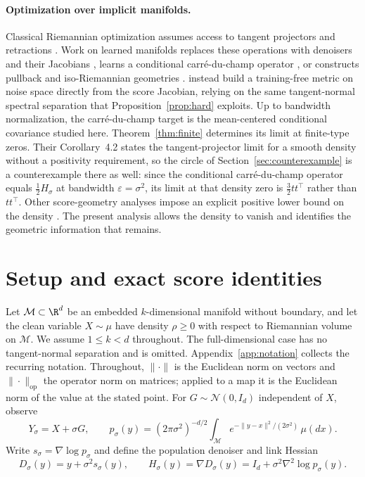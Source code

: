 \documentclass[10pt]{article}
\theoremstyle{c2fup}
\newcommand{\M}{\mathcal{M}}
\newcommand{\op}{\mathrm{op}}
\newcommand{\cN}{\mathcal{N}}
\begin{document}
\paragraph{Optimization over implicit manifolds.}
Classical Riemannian optimization assumes access to tangent projectors and retractions \citep{absil2008optimization,boumal2023introduction}.  Work on learned manifolds replaces these operations with denoisers and their Jacobians \citep{kharitenko2026landing}, learns a conditional carré-du-champ operator \citep{bamberger2026metric}, or constructs pullback and iso-Riemannian geometries \citep{diepeveen2025pullback,diepeveen2026iso}.  \citet{saito2025tangential} instead build a training-free metric on noise space directly from the score Jacobian, relying on the same tangent-normal spectral separation that Proposition~\ref{prop:hard} exploits.  Up to bandwidth normalization, the carré-du-champ target is the mean-centered conditional covariance studied here.  Theorem~\ref{thm:finite} determines its limit at finite-type zeros.  Their Corollary~4.2 states the tangent-projector limit for a smooth density without a positivity requirement, so the circle of Section~\ref{sec:counterexample} is a counterexample there as well: since the conditional carré-du-champ operator equals $\tfrac12H_\sigma$ at bandwidth $\varepsilon=\sigma^2$, its limit at that density zero is $\tfrac32tt^\top$ rather than $tt^\top$.  Other score-geometry analyses impose an explicit positive lower bound on the density \citep{stanczuk2024diffusion,li2026scores,zhang2026score}.  The present analysis allows the density to vanish and identifies the geometric information that remains.

\section{Setup and exact score identities}
\label{sec:setup}

Let $\M\subset\R^d$ be an embedded $k$-dimensional manifold without boundary, and let the clean variable $X\sim\mu$ have density $\rho\ge0$ with respect to Riemannian volume on $\M$.  We assume $1\le k<d$ throughout.  The full-dimensional case has no tangent-normal separation and is omitted.  Appendix~\ref{app:notation} collects the recurring notation.  Throughout, $\|\cdot\|$ is the Euclidean norm on vectors and $\|\cdot\|_\op$ the operator norm on matrices; applied to a map it is the Euclidean norm of the value at the stated point.  For $G\sim\cN(0,I_d)$ independent of $X$, observe
\begin{equation}
  Y_\sigma=X+\sigma G,
  \qquad
  p_\sigma(y)=(2\pi\sigma^2)^{-d/2}
  \int_\M e^{-\|y-x\|^2/(2\sigma^2)}\,\mu(dx).
\end{equation}
Write $s_\sigma=\nabla\log p_\sigma$ and define the population denoiser and link Hessian
\begin{equation}
  D_\sigma(y)=y+\sigma^2s_\sigma(y),
  \qquad
  H_\sigma(y)=\nabla D_\sigma(y)=I_d+\sigma^2\nabla^2\log p_\sigma(y).
  \label{eq:link}
\end{equation}
\end{document}
